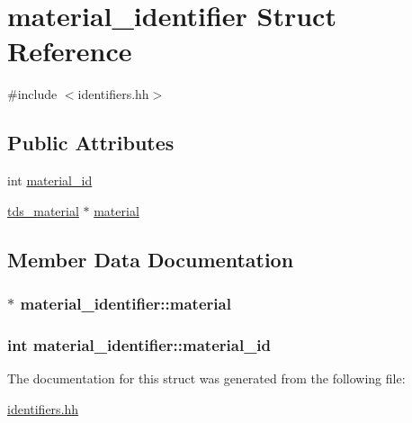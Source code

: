 \hypertarget{structmaterial__identifier}{}\section{material\+\_\+identifier Struct Reference}
\label{structmaterial__identifier}


{\ttfamily \#include $<$identifiers.\+hh$>$}

\subsection*{Public Attributes}
\begin{DoxyCompactItemize}
\item 
int \hyperlink{structmaterial__identifier_a0a78177622843fe4acef33c396737e03}{material\+\_\+id}
\item 
\hyperlink{classtds__material}{tds\+\_\+material} $\ast$ \hyperlink{structmaterial__identifier_a7721b745f0f7d8f365d0b38144e115eb}{material}
\end{DoxyCompactItemize}


\subsection{Member Data Documentation}
\subsubsection[{\texorpdfstring{material}{material}}]{$\ast$ material\+\_\+identifier\+::material}\hypertarget{structmaterial__identifier_a7721b745f0f7d8f365d0b38144e115eb}{}\label{structmaterial__identifier_a7721b745f0f7d8f365d0b38144e115eb}
\subsubsection[{\texorpdfstring{material\+\_\+id}{material_id}}]{\setlength{\rightskip}{0pt plus 5cm}int material\+\_\+identifier\+::material\+\_\+id}\hypertarget{structmaterial__identifier_a0a78177622843fe4acef33c396737e03}{}\label{structmaterial__identifier_a0a78177622843fe4acef33c396737e03}


The documentation for this struct was generated from the following file\+:\begin{DoxyCompactItemize}
\item 
\hyperlink{identifiers_8hh}{identifiers.\+hh}\end{DoxyCompactItemize}
